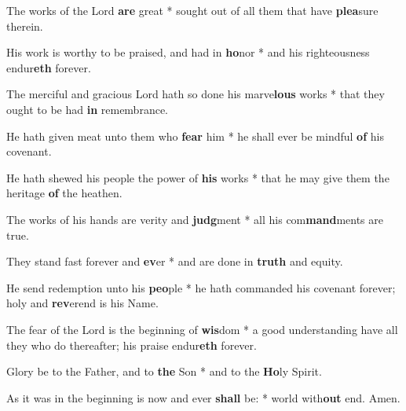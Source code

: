 \begin{multicols}{2}
	The works of the Lord \textbf{are} great * sought out of all them that have \textbf{plea}sure therein.
	
	His work is worthy to be praised, and had in \textbf{ho}nor * and his righteousness endur\textbf{eth} forever.
	
	The merciful and gracious Lord hath so done his marve\textbf{lous} works * that they ought to be had \textbf{in} remembrance.
	
	He hath given meat unto them who \textbf{fear} him * he shall ever be mindful \textbf{of} his covenant.
	
	He hath shewed his people the power of \textbf{his} works * that he may give them the heritage \textbf{of} the heathen.
	
	The works of his hands are verity and \textbf{judg}ment * all his com\textbf{mand}ments are true.
	
	They stand fast forever and \textbf{ev}er * and are done in \textbf{truth} and equity.
	
	He send redemption unto his \textbf{peo}ple * he hath commanded his covenant forever; holy and \textbf{rev}erend is his Name.
	
	The fear of the Lord is the beginning of \textbf{wis}dom * a good understanding have all they who do thereafter; his praise endur\textbf{eth} forever.
	
	Glory be to the Father, and to \textbf{the} Son * and to the \textbf{Ho}ly Spirit.
	
	As it was in the beginning is now and ever \textbf{shall} be: * world with\textbf{out} end. Amen.
\end{multicols}